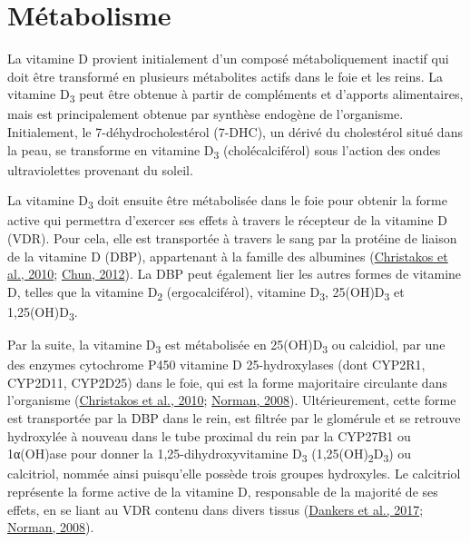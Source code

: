 \documentclass[
  a4paper,
  DIV=11,
  numbers=noendperiod,
  listof=totoc]{scrreprt}
\begin{document}
\hypertarget{muxe9tabolisme}{%
\section{Métabolisme}\label{muxe9tabolisme}}

La vitamine D provient initialement d'un composé métaboliquement inactif
qui doit être transformé en plusieurs métabolites actifs dans le foie et
les reins. La vitamine D\textsubscript{3} peut être obtenue à partir de
compléments et d'apports alimentaires, mais est principalement obtenue
par synthèse endogène de l'organisme. Initialement, le
7-déhydrocholestérol (7-DHC), un dérivé du cholestérol situé dans la
peau, se transforme en vitamine D\textsubscript{3} (cholécalciférol)
sous l'action des ondes ultraviolettes provenant du soleil.

La vitamine D\textsubscript{3} doit ensuite être métabolisée dans le
foie pour obtenir la forme active qui permettra d'exercer ses effets à
travers le récepteur de la vitamine D (VDR). Pour cela, elle est
transportée à travers le sang par la protéine de liaison de la vitamine
D (DBP), appartenant à la famille des albumines
(\protect\hyperlink{ref-Christakos.2010}{Christakos et al., 2010};
\protect\hyperlink{ref-Chun.2012}{Chun, 2012}). La DBP peut également
lier les autres formes de vitamine D, telles que la vitamine
D\textsubscript{2} (ergocalciférol), vitamine D\textsubscript{3},
25(OH)D\textsubscript{3} et 1,25(OH)D\textsubscript{3}.

Par la suite, la vitamine D\textsubscript{3} est métabolisée en
25(OH)D\textsubscript{3} ou calcidiol, par une des enzymes cytochrome
P450 vitamine D 25-hydroxylases (dont CYP2R1, CYP2D11, CYP2D25) dans le
foie, qui est la forme majoritaire circulante dans l'organisme
(\protect\hyperlink{ref-Christakos.2010}{Christakos et al., 2010};
\protect\hyperlink{ref-Norman.2008}{Norman, 2008}). Ultérieurement,
cette forme est transportée par la DBP dans le rein, est filtrée par le
glomérule et se retrouve hydroxylée à nouveau dans le tube proximal du
rein par la CYP27B1 ou 1α(OH)ase pour donner la 1,25-dihydroxyvitamine
D\textsubscript{3} (1,25(OH)\textsubscript{2}D\textsubscript{3}) ou
calcitriol, nommée ainsi puisqu'elle possède trois groupes hydroxyles.
Le calcitriol représente la forme active de la vitamine D, responsable
de la majorité de ses effets, en se liant au VDR contenu dans divers
tissus (\protect\hyperlink{ref-Dankers.2017}{Dankers et al., 2017};
\protect\hyperlink{ref-Norman.2008}{Norman, 2008}).
\end{document}
